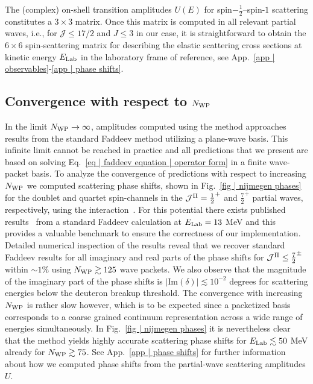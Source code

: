 \documentclass[aps,prc,showpacs,twocolumn,floatfix,nobibnotes,nofootinbib,amsmath,amssymb,longbibliography]{revtex4-2}
\begin{document}
The (complex) on-shell transition amplitudes $U(E)$ for
spin$-\frac{1}{2}$--spin-$1$ scattering constitutes a $3\times 3$
matrix. Once this matrix is computed in all relevant \NNN{} partial
waves, i.e., for $\mathcal{J}\leq 17/2$ and $J \leq 3$ in our case, it is
straightforward to obtain the $6 \times 6$ spin-scattering matrix for
describing the elastic \Nd{} scattering cross sections at kinetic
energy $E_\text{Lab}$ in the laboratory frame of reference, see App.~\ref{app
  | observables}-\ref{app | phase shifts}.

\subsection{Convergence with respect to $N_{\text{WP}}$}
\label{sec | WP convergence}
In the limit $N_{\text{WP}} \rightarrow \infty$, amplitudes computed using the
\wpcd{} method approaches results from the standard Faddeev method
utilizing a plane-wave basis. This infinite limit cannot be reached in
practice and all \wpcd{} predictions that we present are based on
solving Eq.~\eqref{eq | faddeev equation | operator form} in a finite
wave-packet basis. To analyze the convergence of predictions with
respect to increasing $N_{\text{WP}}$ we computed \nd{} scattering phase shifts,
shown in Fig.~\ref{fig | nijmegen phases} for the doublet and quartet
spin-channels in the $\mathcal{J}^{\Pi}= \frac{1}{2}^{+}$ and
$\frac{7}{2}^{+}$ \NNN{} partial waves, respectively, using the
\NijmI{} \NN{} interaction~\cite{Stoks:1994wp}. For this potential
there exists published results~\cite{Gloeckle:1995jg} from a standard
Faddeev calculation at $E_\text{Lab} = 13 $ MeV and this provides a valuable
benchmark to ensure the correctness of our implementation. Detailed
numerical inspection of the results reveal that we recover standard
Faddeev results for all imaginary and real parts of the \NNN{} phase
shifts for $\mathcal{J}^{\Pi}\leq \frac{7}{2}^{\pm}$ within $\sim
1\%$ using $N_{\text{WP}} \gtrsim 125$ wave packets. We also observe that the
magnitude of the imaginary part of the phase shifts is
$|\text{Im}(\delta)|\lesssim 10^{-2}$ degrees for scattering energies
below the deuteron breakup threshold. The convergence with increasing
$N_{\text{WP}}$ is rather slow however, which is to be expected since a
packetized basis corresponds to a coarse grained continuum
representation across a wide range of energies simultaneously. In
Fig.~\ref{fig | nijmegen phases} it is nevertheless clear that the
\wpcd{} method yields highly accurate scattering phase shifts for
$E_\text{Lab}\lesssim 50$ MeV already for $N_{\text{WP}} \gtrsim 75$. See
App.~\ref{app | phase shifts} for further information about how we
computed phase shifts from the partial-wave scattering amplitudes $U$.
\end{document}
